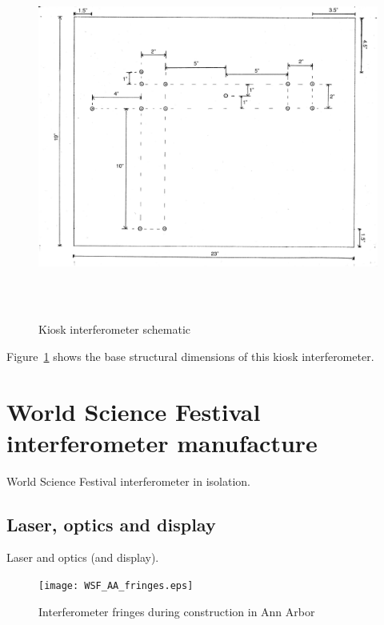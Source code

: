         \begin{figure}
        \begin{center}
        \includegraphics[height=120mm, width=160mm]{ifo_schematic.eps}
        \caption{Kiosk interferometer schematic}
        \label{kiosk_ifo_schematic}
        \end{center}
        \end{figure}

Figure~\ref{kiosk_ifo_schematic} shows the base structural dimensions of this kiosk interferometer.


    \section{World Science Festival interferometer manufacture}
    \label{manufacture}

        World Science Festival interferometer in isolation.

    


        \subsection{Laser, optics and display}
        \label{laser_display}

            Laser and optics (and display).

	\begin{figure}
	\begin{center}
	\texttt{[image: WSF\_AA\_fringes.eps]}
	\caption{Interferometer fringes during construction in Ann Arbor}
	\label{WSF_AA_fringes}
	\end{center}
	\end{figure}


